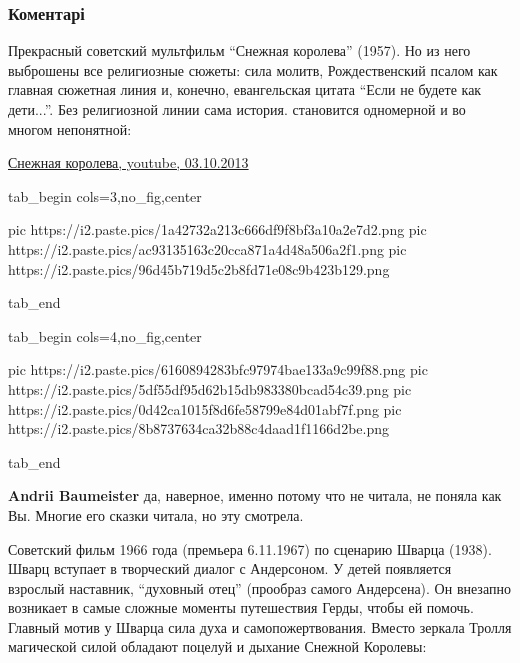  
 
 
 
 
\subsubsection{Коментарі}

\begin{itemize} %

Прекрасный советский мультфильм \enquote{Снежная королева} (1957). Но из него выброшены
все религиозные сюжеты: сила молитв, Рождественский псалом как главная сюжетная
линия и, конечно, евангельская цитата \enquote{Если не будете как дети...}. Без
религиозной линии сама история. становится одномерной и во многом непонятной:

\href{https://youtu.be/1ajPJI5UyS0}{%
Снежная королева, youtube, 03.10.2013%
}

\ifcmt
  tab_begin cols=3,no_fig,center

     pic https://i2.paste.pics/1a42732a213c666df9f8bf3a10a2e7d2.png
		 pic https://i2.paste.pics/ac93135163c20cca871a4d48a506a2f1.png
		 pic https://i2.paste.pics/96d45b719d5c2b8fd71e08c9b423b129.png

  tab_end

  tab_begin cols=4,no_fig,center

		 pic https://i2.paste.pics/6160894283bfc97974bae133a9c99f88.png
		 pic https://i2.paste.pics/5df55df95d62b15db983380bcad54c39.png
		 pic https://i2.paste.pics/0d42ca1015f8d6fe58799e84d01abf7f.png
		 pic https://i2.paste.pics/8b8737634ca32b88c4daad1f1166d2be.png

  tab_end
\fi

\begin{itemize} %
\textbf{Andrii Baumeister} да, наверное, именно потому что не читала, не поняла как Вы. Многие его сказки читала, но эту смотрела.
\end{itemize} %



Советский фильм 1966 года (премьера 6.11.1967) по сценарию Шварца (1938). Шварц
вступает в творческий диалог с Андерсоном. У детей появляется взрослый
наставник, \enquote{духовный отец} (прообраз самого Андерсена). Он внезапно возникает в
самые сложные моменты путешествия Герды, чтобы ей помочь. Главный мотив у
Шварца сила духа и самопожертвования. Вместо зеркала Тролля магической силой
обладают поцелуй и дыхание Снежной Королевы:


\end{itemize}
